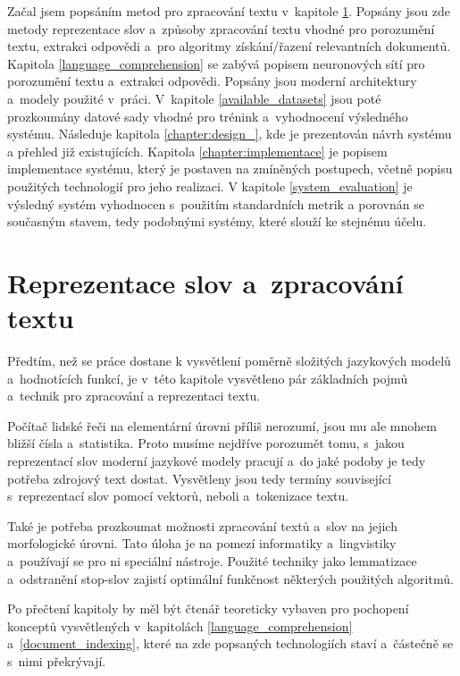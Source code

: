 Začal jsem popsáním metod pro zpracování textu v~kapitole \ref{text_processing}. Popsány jsou zde metody reprezentace slov a~způsoby zpracování textu vhodné pro porozumění textu, extrakci odpovědi a~pro algoritmy získání/řazení relevantních dokumentů. Kapitola \ref{language_comprehension} se zabývá popisem neuronových sítí pro porozumění textu a~extrakci odpovědi. Popsány jsou moderní architektury a~modely použité v~práci. V~kapitole \ref{available_datasets} jsou poté prozkoumány datové sady vhodné pro trénink a~vyhodnocení výsledného systému. Následuje kapitola \ref{chapter:design_}, kde je prezentován návrh systému a přehled již existujících. Kapitola \ref{chapter:implementace} je popisem implementace systému, který je postaven na zmíněných postupech, včetně popisu použitých technologií pro jeho realizaci. V kapitole \ref{system_evaluation} je výsledný systém vyhodnocen s~použitím standardních metrik a porovnán se současným stavem, tedy podobnými systémy, které slouží ke stejnému účelu.


\chapter{Reprezentace slov a~zpracování textu}
\label{text_processing}

Předtím, než se práce dostane k vysvětlení poměrně složitých jazykových modelů a~hodnotících funkcí, je v~této kapitole vysvětleno pár základních pojmů a~technik pro zpracování a reprezentaci textu.\par 
Počítač lidské řeči na elementární úrovni příliš nerozumí, jsou mu ale mnohem bližší čísla a~statistika. Proto musíme nejdříve porozumět tomu, s~jakou reprezentací slov moderní jazykové modely pracují a~do jaké podoby je tedy potřeba zdrojový text dostat. Vysvětleny jsou tedy termíny související s~reprezentací slov pomocí vektorů, neboli  a~tokenizace textu.\par 
Také je potřeba prozkoumat možnosti zpracování textů a~slov na jejich morfologické úrovni. Tato úloha je na pomezí informatiky a~lingvistiky a~používají se pro ni speciální nástroje. Použité techniky jako lemmatizace a~odstranění stop-slov zajistí optimální funkčnost některých použitých algoritmů.\par
Po přečtení kapitoly by měl být čtenář teoreticky vybaven pro pochopení konceptů vysvětlených v~kapitolách \ref{language_comprehension} a~\ref{document_indexing}, které na zde popsaných technologiích staví a~částečně se s~nimi překrývají.


